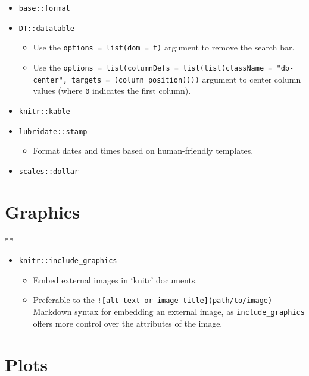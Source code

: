 \documentclass[
]{book}
\providecommand{\tightlist}{%
  \setlength{\itemsep}{0pt}\setlength{\parskip}{0pt}}
\begin{document}
\begin{itemize}
\tightlist
\item
  \texttt{base::format}
\item
  \texttt{DT::datatable}

  \begin{itemize}
  \tightlist
  \item
    Use the \texttt{options\ =\ list(dom\ =\ \textquotesingle{}t\textquotesingle{})} argument to remove the search bar.
  \item
    Use the \texttt{options\ =\ list(columnDefs\ =\ list(list(className\ =\ "db-center",\ targets\ =\ (column\_position))))} argument to center column values (where \texttt{0} indicates the first column).
  \end{itemize}
\item
  \texttt{knitr::kable}
\item
  \texttt{lubridate::stamp}

  \begin{itemize}
  \tightlist
  \item
    Format dates and times based on human-friendly templates.
  \end{itemize}
\item
  \texttt{scales::dollar}
\end{itemize}

\hypertarget{graphics}{%
\section{Graphics}\label{graphics}}

**

\begin{itemize}
\tightlist
\item
  \texttt{knitr::include\_graphics}

  \begin{itemize}
  \tightlist
  \item
    Embed external images in `knitr' documents.
  \item
    Preferable to the \texttt{!{[}alt\ text\ or\ image\ title{]}(path/to/image)} Markdown syntax for embedding an external image, as \texttt{include\_graphics} offers more control over the attributes of the image.
  \end{itemize}
\end{itemize}

\hypertarget{plots}{%
\section{Plots}\label{plots}}
\end{document}
